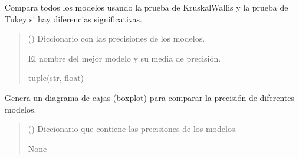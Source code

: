 \documentclass[letterpaper,10pt,spanish]{sphinxmanual}
\begin{document}
\label{\detokenize{Funciones_Generales:module-comparacion_n_covariables}}

\begin{fulllineitems}
\label{\detokenize{Funciones_Generales:comparacion_n_covariables.comparar_todos_modelos}}
\pysigstartsignatures
\pysiglinewithargsret
{}
{\sphinxparamcomma {}}
{}
\pysigstopsignatures
\sphinxAtStartPar
Compara todos los modelos usando la prueba de Kruskal\sphinxhyphen{}Wallis y la prueba de Tukey si hay diferencias significativas.
\begin{quote}\begin{description}
\sphinxAtStartPar
{} () \textendash{} Diccionario con las precisiones de los modelos.

\sphinxAtStartPar
El nombre del mejor modelo y su media de precisión.

\sphinxAtStartPar
tuple(str, float)

\end{description}\end{quote}

\end{fulllineitems}


\begin{fulllineitems}
\label{\detokenize{Funciones_Generales:comparacion_n_covariables.diagrama_cajas}}
\pysigstartsignatures
\pysiglinewithargsret
{}
{}
{}
\pysigstopsignatures
\sphinxAtStartPar
Genera un diagrama de cajas (boxplot) para comparar la precisión de diferentes modelos.
\begin{quote}\begin{description}
\sphinxAtStartPar
{} () \textendash{} Diccionario que contiene las precisiones de los modelos.

\sphinxAtStartPar
None

\end{description}\end{quote}

\end{fulllineitems}
\end{document}
